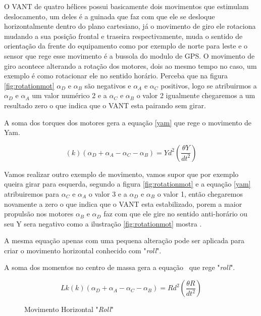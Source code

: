 O VANT de quatro hélices possui basicamente dois movimentos que estimulam deslocamento, um deles é a guinada que faz com que ele se desloque horizontalmente dentro do plano cartesiano, já o movimento de giro ele rotaciona mudando a sua posição frontal e traseira respectivamente, muda o sentido de orientação da frente do equipamento como por exemplo de norte para leste e o sensor que rege esse movimento é a bussola do modulo de GPS. O movimento de giro acontece alterando a rotação dos motores, dois ao mesmo tempo no caso, um exemplo é como rotacionar ele no sentido horário. Perceba que na figura \ref{fig:rotationmot} $\alpha_{D}$ e $\alpha_{B}$ são negativos e $\alpha_{A}$ e $\alpha_{C}$ positivos, logo se atribuirmos a $\alpha_{D}$ e $\alpha_{A}$ um valor numérico 2 e a $\alpha_{C}$ e $\alpha_{B}$ o valor 2 igualmente chegaremos a um resultado zero o que indica que o VANT esta pairando sem girar.  

A soma dos torques dos motores gera a equação \ref{yam} que rege o movimento de Yam. 

\begin{equation}
    \label{yam}
    \left(k\right)\left(\alpha_{D}+\alpha_{A}-\alpha_{C}-\alpha_{B}\right)=Yd^2\left(\frac{\theta Y}{dt^2}\right)
\end{equation}

Vamos realizar outro exemplo de movimento, vamos supor que por exemplo queira girar para esquerda, segundo a figura \ref{fig:rotationmot} e a equação \ref{yam} atribuiremos para $\alpha_{C}$ e $\alpha_{A}$ o valor 3 e a $\alpha_{D}$ e $\alpha_{B}$ o valor 1, então chegaremos novamente a zero o que indica que o VANT esta estabilizado, porem a maior propulsão nos motores $\alpha_{B}$ e $\alpha_{D}$ faz com que ele gire no sentido anti-horário ou seu Y sera negativo como a ilustração \ref{fig:rotationmot} mostra \cite{momesf}.

A mesma equação apenas com uma pequena alteração pode ser aplicada para criar o movimento horizontal conhecido com "\textit{roll}". 

A soma dos momentos no centro de massa gera a equação \ que rege "\textit{roll}". 

\begin{equation}
    \label{roll}
    Lk\left(k\right)\left(\alpha_{D}+\alpha_{A}-\alpha_{C}-\alpha_{B}\right)=Rd^2\left(\frac{\theta R}{dt^2}\right)
\end{equation}

\begin{figure}[H]
	\centering
	\caption{Movimento Horizontal "\textit{Roll}"}
		\fontsize{9pt}{12pt}\selectfont
	\def\svgwidth{15cm}
	
	\label{fig:roll}
\end{figure}

